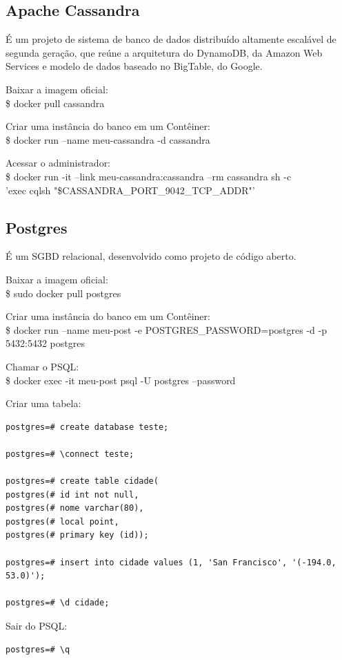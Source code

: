 \documentclass[a4paper,11pt]{article}
\begin{document}
\subsection{Apache Cassandra}
É um projeto de sistema de banco de dados distribuído altamente escalável de segunda geração, que reúne a arquitetura do DynamoDB, da Amazon Web Services e modelo de dados baseado no BigTable, do Google. 

Baixar a imagem oficial: \\
{\ttfamily\$ docker pull cassandra}

Criar uma instância do banco em um Contêiner: \\
{\ttfamily\$ docker run --name meu-cassandra -d cassandra}

Acessar o administrador: \\
{\ttfamily\$ docker run -it --link meu-cassandra:cassandra --rm cassandra sh -c \\ 'exec cqlsh "\$CASSANDRA\_PORT\_9042\_TCP\_ADDR"'}

\subsection{Postgres}
É um SGBD relacional, desenvolvido como projeto de código aberto. 

Baixar a imagem oficial: \\
{\ttfamily\$ sudo docker pull postgres}

Criar uma instância do banco em um Contêiner: \\
{\ttfamily\$ docker run --name meu-post -e POSTGRES\_PASSWORD=postgres -d -p 5432:5432 postgres}

Chamar o PSQL: \\
{\ttfamily\$ docker exec -it meu-post psql -U postgres --password}

Criar uma tabela:
\begin{lstlisting}
postgres=# create database teste;

postgres=# \connect teste;

postgres=# create table cidade(
postgres(# id int not null,
postgres(# nome varchar(80),
postgres(# local point,
postgres(# primary key (id));

postgres=# insert into cidade values (1, 'San Francisco', '(-194.0, 53.0)');

postgres=# \d cidade;
\end{lstlisting}

Sair do PSQL:
\begin{lstlisting}
postgres=# \q
\end{lstlisting}
\end{document}
